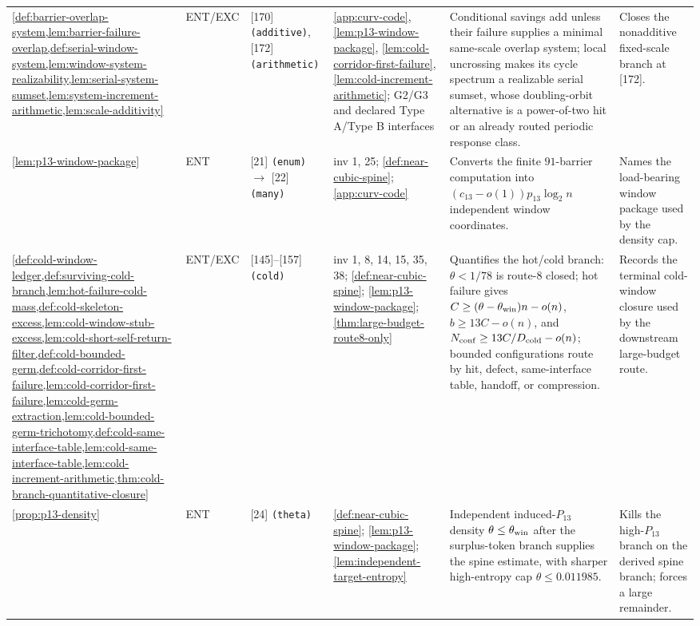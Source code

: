 \documentclass[11pt]{article}
\begin{document}
{\begin{longtable}{L{0.10\textwidth} C{0.045\textwidth} L{0.13\textwidth} L{0.135\textwidth} L{0.28\textwidth} L{0.20\textwidth}}
\cref{def:barrier-overlap-system,lem:barrier-failure-overlap,def:serial-window-system,lem:window-system-realizability,lem:serial-system-sumset,lem:system-increment-arithmetic,lem:scale-additivity} & ENT\slash EXC & [170] \texttt{(additive)}, [172] \texttt{(arithmetic)} & \cref{app:curv-code}, \cref{lem:p13-window-package}, \cref{lem:cold-corridor-first-failure}, \cref{lem:cold-increment-arithmetic}; G2/G3 and declared Type A/Type B interfaces & Conditional savings add unless their failure supplies a minimal same-scale overlap system; local uncrossing makes its cycle spectrum a realizable serial sumset, whose doubling-orbit alternative is a power-of-two hit or an already routed periodic response class. & Closes the nonadditive fixed-scale branch at [172]. \\
\cref{lem:p13-window-package} & ENT & [21] \texttt{(enum)} $\to$ [22] \texttt{(many)} & inv 1, 25; \cref{def:near-cubic-spine}; \cref{app:curv-code} & Converts the finite \(91\)-barrier computation into \((c_{13}-o(1))p_{13}\log_2 n\) independent window coordinates. & Names the load-bearing window package used by the density cap. \\
\cref{def:cold-window-ledger,def:surviving-cold-branch,lem:hot-failure-cold-mass,def:cold-skeleton-excess,lem:cold-window-stub-excess,lem:cold-short-self-return-filter,def:cold-bounded-germ,def:cold-corridor-first-failure,lem:cold-corridor-first-failure,lem:cold-germ-extraction,lem:cold-bounded-germ-trichotomy,def:cold-same-interface-table,lem:cold-same-interface-table,lem:cold-increment-arithmetic,thm:cold-branch-quantitative-closure} & ENT\slash EXC & [145]--[157] \texttt{(cold)} & inv 1, 8, 14, 15, 35, 38; \cref{def:near-cubic-spine}; \cref{lem:p13-window-package}; \cref{thm:large-budget-route8-only} & Quantifies the hot/cold branch: \(\theta<1/78\) is route-8 closed; hot failure gives \(C\ge(\theta-\theta_{\rm win})n-o(n)\), \(b\ge13C-o(n)\), and \(N_{\rm conf}\ge13C/D_{\rm cold}-o(n)\); bounded configurations route by hit, defect, same-interface table, handoff, or compression. & Records the terminal cold-window closure used by the downstream large-budget route. \\
\cref{prop:p13-density} & ENT & [24] \texttt{(theta)} & \cref{def:near-cubic-spine}; \cref{lem:p13-window-package}; \cref{lem:independent-target-entropy} & Independent induced-$P_{13}$ density $\theta\le\theta_{\rm win}$ after the surplus-token branch supplies the spine estimate, with sharper high-entropy cap $\theta\le0.011985$. & Kills the high-$P_{13}$ branch on the derived spine branch; forces a large remainder. \\
\bottomrule
\end{longtable}
}
\end{document}
